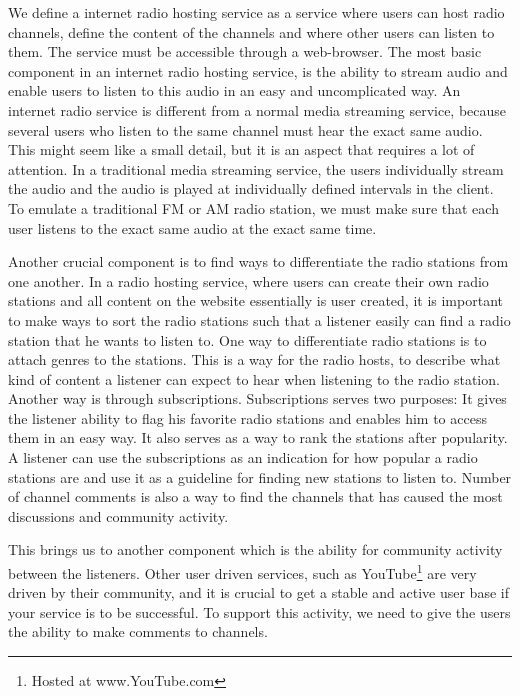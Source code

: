 \documentclass[a4paper,11pt,report]{article}
\begin{document}
We define a internet radio hosting service as a service where users can host radio channels, define the content of the channels and where other users can listen to them. The service must be accessible through a web-browser. The most basic component in an internet radio hosting service, is the ability to stream audio and enable users to listen to this audio in an easy and uncomplicated way. An internet radio service is different from a normal media streaming service, because several users who listen to the same channel must hear the exact same audio. This might seem like a small detail, but it is an aspect that requires a lot of attention. In a traditional media streaming service, the users individually stream the audio and the audio is played at individually defined intervals in the client. To emulate a traditional FM or AM radio station, we must make sure that each user listens to the exact same audio at the exact same time. 

Another crucial component is to find ways to differentiate the radio stations from one another. In a radio hosting service, where users can create their own radio stations and all content on the website essentially is user created, it is important to make ways to sort the radio stations such that a listener easily can find a radio station that he wants to listen to. One way to differentiate radio stations is to attach genres to the stations. This is a way for the radio hosts, to describe what kind of content a listener can expect to hear when listening to the radio station. Another way is through subscriptions. Subscriptions serves two purposes: It gives the listener ability to flag his favorite radio stations and enables him to access them in an easy way. It also serves as a way to rank the stations after popularity. A listener can use the subscriptions as an indication for how popular a radio stations are and use it as a guideline for finding new stations to listen to. Number of channel comments is also a way to find the channels that has caused the most discussions and community activity. 

This brings us to another component which is the ability for community activity between the listeners. Other user driven services, such as YouTube\footnote{Hosted at www.YouTube.com} are very driven by their community, and it is crucial to get a stable and active user base if your service is to be successful. To support this activity, we need to give the users the ability to make comments to channels.
\end{document}
